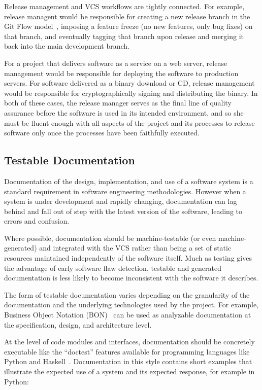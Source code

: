 Release management and VCS workflows are tightly connected. For
example, release managent would be responsible for creating a new
release branch in the Git Flow model~\cite{atlassianworkflow},
imposing a feature freeze (no new features, only bug fixes) on that
branch, and eventually tagging that branch upon release and merging it
back into the main development branch.

For a project that delivers software as a service on a web server,
release management would be responsible for deploying the software to
production servers. For software delivered as a binary download or CD,
release management would be responsible for cryptographically signing
and distributing the binary. In both of these cases, the release
manager serves as the final line of quality assurance before the
software is used in its intended environment, and so she must be
fluent enough with all aspects of the project and its processes to
release software only once the processes have been faithfully
executed.

\subsection{Testable Documentation}

Documentation of the design, implementation, and use of a software
system is a standard requirement in software engineering
methodologies. However when a system is under development and rapidly
changing, documentation can lag behind and fall out of step with the
latest version of the software, leading to errors and confusion.

Where possible, documentation should be machine-testable (or even
machine-generated) and integrated with the VCS rather than being a set
of static resources maintained independently of the software
itself. Much as testing gives the advantage of early software flaw
detection, testable and generated documentation is less likely to
become inconsistent with the software it describes.

The form of testable documentation varies depending on the granularity
of the documentation and the underlying technologies used by the
project. For example, Business Object Notation
(BON)~\cite{walden1995seamless} can be used as analyzable
documentation at the specification, design, and architecture level.

At the level of code modules and interfaces, documentation should be
concretely executable like the ``doctest'' features available for
programming languages like Python and
Haskell~\cite{python3doctest}. Documentation in this style contains
short examples that illustrate the expected use of a system and its
expected response, for example in Python:

